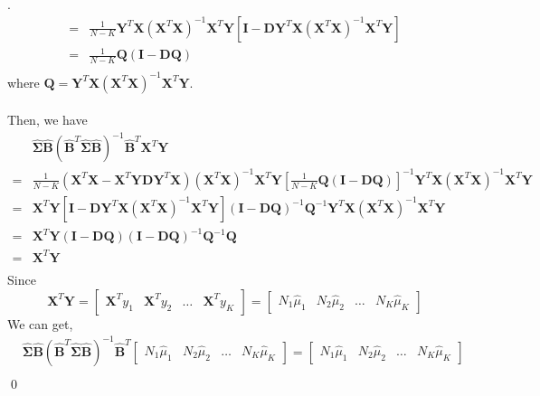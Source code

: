 \documentclass[12pt]{article}
\newenvironment{sol}
  {\par\vspace{3mm}\noindent{\it Solution}.}
  {\qed}
\begin{document}
\begin{sol}
\begin{equation*}
\begin{split}
= &\frac{1}{N-K}\mathbf{Y}^T\mathbf{X}(\mathbf{X}^T\mathbf{X})^{-1}\mathbf{X}^T\mathbf{Y}[\mathbf{I}-\mathbf{D}\mathbf{Y}^T\mathbf{X}(\mathbf{X}^T\mathbf{X})^{-1}\mathbf{X}^T\mathbf{Y}]\\
= &\frac{1}{N-K}\mathbf{Q}(\mathbf{I}-\mathbf{DQ})\\
\end{split}
\end{equation*}
where $\mathbf{Q}=\mathbf{Y}^T\mathbf{X}(\mathbf{X}^T\mathbf{X})^{-1}\mathbf{X}^T\mathbf{Y}$.\\
\\
Then, we have
\begin{equation*}
\begin{split}
&\hat{\mathbf\Sigma}\hat{\mathbf{B}}(\hat{\mathbf{B}}^T\hat{\mathbf\Sigma}\hat{\mathbf{B}})^{-1}\hat{\mathbf{B}}^T\mathbf{X}^T\mathbf{Y}\\
= &\frac{1}{N-K}\left(\mathbf{X}^T\mathbf{X}-\mathbf{X}^T\mathbf{Y}\mathbf{D}\mathbf{Y}^T\mathbf{X}\right)(\mathbf{X}^T\mathbf{X})^{-1}\mathbf{X}^T\mathbf{Y}
\left[\frac{1}{N-K}\mathbf{Q}(\mathbf{I}-\mathbf{DQ})\right]^{-1}\mathbf{Y}^T\mathbf{X}(\mathbf{X}^T\mathbf{X})^{-1}\mathbf{X}^T\mathbf{Y}\\
= &\mathbf{X}^T\mathbf{Y}[\mathbf{I}-\mathbf{D}\mathbf{Y}^T\mathbf{X}(\mathbf{X}^T\mathbf{X})^{-1}\mathbf{X}^T\mathbf{Y}](\mathbf{I}-\mathbf{DQ})^{-1}\mathbf{Q}^{-1}
\mathbf{Y}^T\mathbf{X}(\mathbf{X}^T\mathbf{X})^{-1}\mathbf{X}^T\mathbf{Y}\\
= &\mathbf{X}^T\mathbf{Y}(\mathbf{I}-\mathbf{DQ})(\mathbf{I}-\mathbf{DQ})^{-1}\mathbf{Q}^{-1}\mathbf{Q}\\
= &\mathbf{X}^T\mathbf{Y}\\
\end{split}
\end{equation*}
Since
$$\mathbf{X}^T\mathbf{Y}=[\begin{matrix} \mathbf{X}^Ty_1 & \mathbf{X}^Ty_2 & \dots & \mathbf{X}^Ty_K \end{matrix}]
=[\begin{matrix} N_1\hat{\mu}_1 & N_2\hat{\mu}_2 & \dots & N_K\hat{\mu}_K \end{matrix}]$$
We can get,
\begin{equation*}
\begin{split}
 &\hat{\mathbf\Sigma}\hat{\mathbf{B}}(\hat{\mathbf{B}}^T\hat{\mathbf\Sigma}\hat{\mathbf{B}})^{-1}\hat{\mathbf{B}}^T[\begin{matrix} N_1\hat{\mu}_1 & N_2\hat{\mu}_2 & \dots & N_K\hat{\mu}_K \end{matrix}]=[\begin{matrix} N_1\hat{\mu}_1 & N_2\hat{\mu}_2 & \dots & N_K\hat{\mu}_K \end{matrix}]\\

\end{split}
\end{equation*}
\end{sol}
\end{document}
